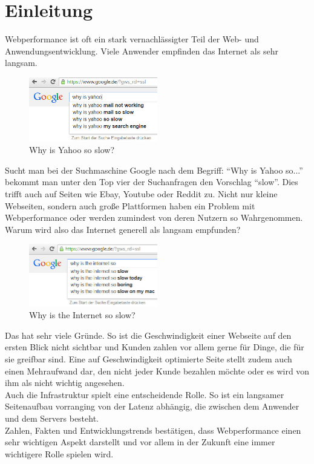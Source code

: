 \documentclass[a4paper,11pt,singlespacing]{article}
\begin{document}
\section{Einleitung} %
\label{sec:einleitung}
	Webperformance ist oft ein stark vernachlässigter Teil der Web- und Anwendungsentwicklung. Viele Anwender empfinden das Internet als sehr langsam.
	\begin{figure}[htbp]
		\begin{center}
			\includegraphics[width=0.5\textwidth]{yahoo.jpg}
		\end{center}
		\caption{Why is Yahoo so slow?}
		\label{fig:YahooIsSlow}
	\end{figure}
	Sucht man bei der Suchmaschine Google nach dem Begriff: "`Why is Yahoo so..."' bekommt man unter den Top vier der Suchanfragen den Vorschlag "`slow"'. Dies trifft auch auf Seiten wie Ebay, Youtube oder Reddit zu. Nicht nur kleine Webseiten, sondern auch große Plattformen haben ein Problem mit Webperformance oder werden zumindest von deren Nutzern so Wahrgenommen. Warum wird also das Internet generell als langsam empfunden?
	\begin{figure}[htbp]
	 	\begin{center}
	 		\includegraphics[width=0.5\textwidth]{internet.jpg}
	 	\end{center}
	 	\caption{Why is the Internet so slow?}
	 	\label{fig:internetIsSlow}
	 \end{figure} 

	Das hat sehr viele Gründe. So ist die Geschwindigkeit einer Webseite auf den ersten Blick nicht sichtbar und Kunden zahlen vor allem gerne für Dinge, die für sie greifbar sind. Eine auf Geschwindigkeit optimierte Seite stellt zudem auch einen Mehraufwand dar, den nicht jeder Kunde bezahlen möchte oder es wird von ihm als nicht wichtig angesehen.\\
	Auch die Infrastruktur spielt eine entscheidende Rolle. So ist ein langsamer Seitenaufbau vorranging von der Latenz abhängig, die zwischen dem Anwender und dem Servers besteht.\\
	Zahlen, Fakten und Entwicklungstrends bestätigen, dass Webperformance einen sehr wichtigen Aspekt darstellt und vor allem in der Zukunft eine immer wichtigere Rolle spielen wird.\\
\end{document}
